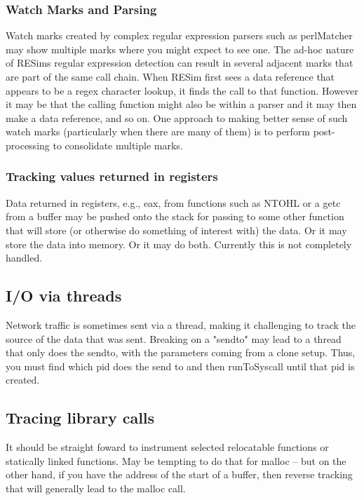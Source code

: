 \documentclass[titlepage]{article}
\begin{document}
\begin{appendices}
\subsubsection{Watch Marks and Parsing}
Watch marks created by complex regular expression parsers such as perlMatcher may show multiple marks where you might expect to see one.  The ad-hoc nature
of RESims regular expression detection can result in several adjacent marks that are part of the same call chain.  When RESim first sees a data reference
that appears to be a regex character lookup, it finds the call to that function.  However it may be that the calling function might also be within a parser
and it may then make a data reference, and so on.  One approach to making better sense of such watch marks (particularly when there are many of them) is
to perform post-processing to consolidate multiple marks. 

\subsubsection{Tracking values returned in registers}
Data returned in registers, e.g., eax, from functions such as NTOHL or a getc from a buffer may be pushed onto the stack for passing to some
other function that will store (or otherwise do something of interest with) the data.  Or it may store the data into memory.  Or it may do both.
Currently this is not completely handled.

\subsection{I/O via threads}
Network traffic is sometimes sent via a thread, making it challenging to track the source of the data that was sent.  Breaking on a "sendto" may
lead to a thread that only does the sendto, with the parameters coming from a clone setup.  Thus, you must find which pid does the send to and then
runToSyscall until that pid is created.

\subsection{Tracing library calls}
It should be straight foward to instrument selected relocatable functions or statically linked functions.
May be tempting to do that for malloc -- but on the other hand, if you have the address of the start of a buffer, then reverse tracking that
will generally lead to the malloc call.




\end{appendices}
\end{document}
